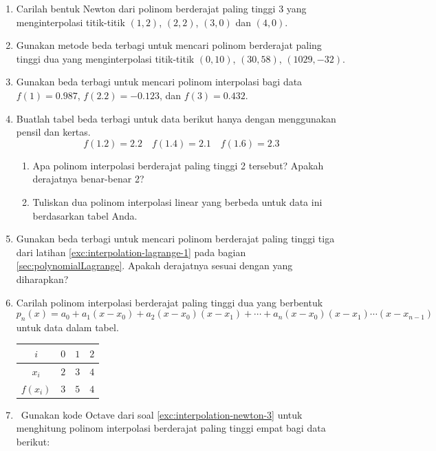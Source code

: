 \begin{small}
\begin{enumerate}
\begin{enumerate}
\item Carilah koefisien utama polinom berderajat terendah yang menginterpolasi
data tersebut.
\item Misalkan juga bahwa $f(0.5)=0.11$. Gunakan hasil sebelumnya untuk
mencari koefisien utama polinom berderajat terendah yang menginterpolasi
seluruh data.
\end{enumerate}
\item \label{exc:interpolation-newton-4}Carilah bentuk Newton dari polinom
berderajat paling tinggi 3 yang menginterpolasi titik-titik $(1,2)$,
$(2,2)$, $(3,0)$ dan $(4,0)$. \hasasolution 
\item \label{exc:interpolation-newton-5}Gunakan metode beda terbagi untuk
mencari polinom berderajat paling tinggi dua yang menginterpolasi
titik-titik $(0,10)$, $(30,58)$, $(1029,-32)$. \hasananswer 
\item \label{exc:interpolation-newton}Gunakan beda terbagi untuk mencari
polinom interpolasi bagi data $f(1)=0.987$, $f(2.2)=-0.123$, dan
$f(3)=0.432$. \hasasolution 
\item Buatlah tabel beda terbagi untuk data berikut hanya dengan menggunakan
pensil dan kertas.
\[
f(1.2)=2.2\quad f(1.4)=2.1\quad f(1.6)=2.3
\]

\begin{enumerate}
\item Apa polinom interpolasi berderajat paling tinggi 2 tersebut? Apakah
derajatnya benar-benar 2?
\item Tuliskan dua polinom interpolasi linear yang berbeda untuk data ini
berdasarkan tabel Anda.
\end{enumerate}
\item \label{exc:interpolation-newton-6}Gunakan beda terbagi untuk mencari
polinom berderajat paling tinggi tiga dari latihan \ref{exc:interpolation-lagrange-1}
pada bagian \ref{sec:polynomialLagrange}. Apakah derajatnya sesuai
dengan yang diharapkan? \hasananswer 
\item \label{exc:interpolation-newton-2}Carilah polinom interpolasi berderajat
paling tinggi dua yang berbentuk 
\[
p_{n}(x)=a_{0}+a_{1}(x-x_{0})+a_{2}(x-x_{0})(x-x_{1})+\cdots+a_{n}(x-x_{0})(x-x_{1})\cdots(x-x_{n-1})
\]
untuk data dalam tabel.

\begin{center}
\begin{tabular}{c|ccc}
$i$ & $0$ & $1$ & $2$\tabularnewline
\hline 
$x_{i}$ & $2$ & $3$ & $4$\tabularnewline
$f(x_{i})$ & $3$ & $5$ & $4$\tabularnewline
\end{tabular}
\par\end{center}
\item \label{exc:interpolation-newton-7}\octave\ Gunakan kode Octave dari
soal \ref{exc:interpolation-newton-3} untuk menghitung polinom interpolasi
berderajat paling tinggi empat bagi data berikut:


\end{enumerate}
\end{small}
